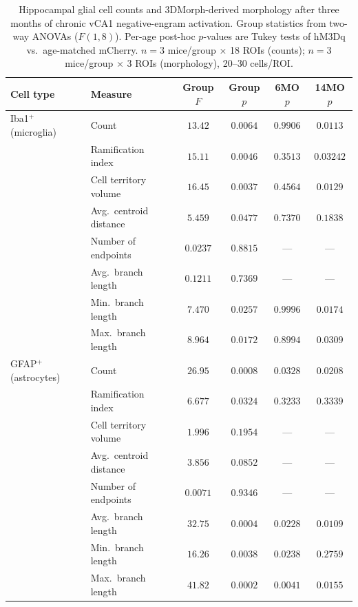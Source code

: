 \documentclass[11pt]{article}
\begin{document}
\begin{table}[htbp]
\centering
\caption{Hippocampal glial cell counts and 3DMorph-derived morphology after three months of chronic vCA1 negative-engram activation. Group statistics from two-way ANOVAs ($F(1,8)$). Per-age post-hoc $p$-values are Tukey tests of hM3Dq vs.~age-matched mCherry. $n=3$ mice/group $\times$ 18 ROIs (counts); $n=3$ mice/group $\times$ 3 ROIs (morphology), 20--30 cells/ROI.}
\label{tab:glia}
\small
\begin{tabular}{llcccc}
\toprule
Cell type & Measure & Group $F$ & Group $p$ & 6MO $p$ & 14MO $p$ \\
\midrule
Iba1$^{+}$ (microglia) & Count                    & $13.42$ & $0.0064$ & $0.9906$ & $0.0113$ \\
                       & Ramification index       & $15.11$ & $0.0046$ & $0.3513$ & $0.03242$ \\
                       & Cell territory volume    & $16.45$ & $0.0037$ & $0.4564$ & $0.0129$ \\
                       & Avg.\ centroid distance  & $5.459$ & $0.0477$ & $0.7370$ & $0.1838$ \\
                       & Number of endpoints      & $0.0237$ & $0.8815$ & --- & --- \\
                       & Avg.\ branch length      & $0.1211$ & $0.7369$ & --- & --- \\
                       & Min.\ branch length      & $7.470$  & $0.0257$ & $0.9996$ & $0.0174$ \\
                       & Max.\ branch length      & $8.964$  & $0.0172$ & $0.8994$ & $0.0309$ \\
\midrule
GFAP$^{+}$ (astrocytes) & Count                   & $26.95$ & $0.0008$ & $0.0328$ & $0.0208$ \\
                        & Ramification index      & $6.677$ & $0.0324$ & $0.3233$ & $0.3339$ \\
                        & Cell territory volume   & $1.996$ & $0.1954$ & --- & --- \\
                        & Avg.\ centroid distance & $3.856$ & $0.0852$ & --- & --- \\
                        & Number of endpoints     & $0.0071$ & $0.9346$ & --- & --- \\
                        & Avg.\ branch length     & $32.75$ & $0.0004$ & $0.0228$ & $0.0109$ \\
                        & Min.\ branch length     & $16.26$ & $0.0038$ & $0.0238$ & $0.2759$ \\
                        & Max.\ branch length     & $41.82$ & $0.0002$ & $0.0041$ & $0.0155$ \\
\bottomrule
\end{tabular}
\end{table}
\end{document}
